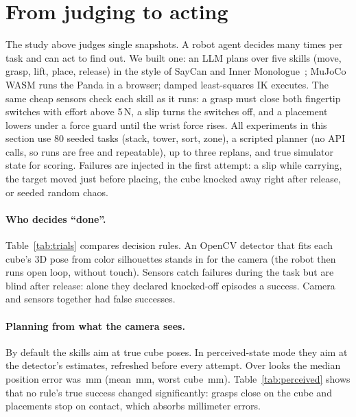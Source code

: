 \documentclass[10pt,twocolumn]{article}
\begin{document}
\section{From judging to acting}
The study above judges single snapshots. A robot agent decides many times per task and can act to find out. We
built one: an LLM plans over five skills (move, grasp, lift, place, release) in the style of SayCan and Inner
Monologue~\cite{saycan,innermono}; MuJoCo WASM runs the Panda in a browser; damped least-squares IK executes. The
same cheap sensors check each skill as it runs: a grasp must close both fingertip switches with effort above 5\,N,
a slip turns the switches off, and a placement lowers under a force guard until the wrist force rises. All
experiments in this section use 80 seeded tasks (stack, tower, sort, zone), a scripted planner (no API calls, so
runs are free and repeatable), up to three replans, and true simulator state for scoring. Failures are injected in
the first attempt: a slip while carrying, the target moved just before placing, the cube knocked away right after
release, or seeded random chaos.

\paragraph{Who decides ``done''.} Table~\ref{tab:trials} compares decision rules. An OpenCV detector that fits each
cube's 3D pose from color silhouettes stands in for the camera (the robot then runs open loop, without touch).
Sensors catch failures during the task but are blind after release: alone they declared \KnockSensorsFalse{}
knocked-off episodes a success. Camera and sensors together had \CombinedFalse{} false successes.
\begin{table}[!htb]\centering\small\resizebox{\columnwidth}{!}{}\caption{True success (\%, 95\% Wilson interval) by decision rule and failure; 80 episodes per cell, 40 for target moved.}\label{tab:trials}\end{table}

\paragraph{Planning from what the camera sees.} By default the skills aim at true cube poses. In perceived-state
mode they aim at the detector's estimates, refreshed before every attempt. Over \PercLooks{} looks the median
position error was \PercMedian\,mm (mean \PercMean\,mm, worst cube \PercWorstMax\,mm). Table~\ref{tab:perceived}
shows that no rule's true success changed significantly: grasps close on the cube and placements stop on
contact, which absorbs millimeter errors.
\begin{table}[!htb]\centering\small\resizebox{\columnwidth}{!}{}\caption{True success (\%) with perceived and true state on the same tasks; McNemar counts only-perceived/only-true correct, and $p$.}\label{tab:perceived}\end{table}
\end{document}
